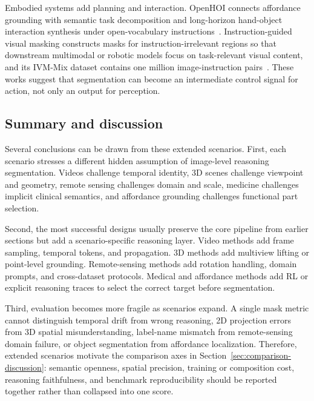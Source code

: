 Embodied systems add planning and interaction. OpenHOI connects affordance grounding with semantic task decomposition and long-horizon hand-object interaction synthesis under open-vocabulary instructions~\citep{zhangOpenhoiOpenworldHandobject2026}. Instruction-guided visual masking constructs masks for instruction-irrelevant regions so that downstream multimodal or robotic models focus on task-relevant visual content, and its IVM-Mix dataset contains one million image-instruction pairs~\citep{zhengInstructionguidedVisualMasking2024}. These works suggest that segmentation can become an intermediate control signal for action, not only an output for perception.

\subsection{Summary and discussion}

Several conclusions can be drawn from these extended scenarios. First, each scenario stresses a different hidden assumption of image-level reasoning segmentation. Videos challenge temporal identity, 3D scenes challenge viewpoint and geometry, remote sensing challenges domain and scale, medicine challenges implicit clinical semantics, and affordance grounding challenges functional part selection.

Second, the most successful designs usually preserve the core pipeline from earlier sections but add a scenario-specific reasoning layer. Video methods add frame sampling, temporal tokens, and propagation. 3D methods add multiview lifting or point-level grounding. Remote-sensing methods add rotation handling, domain prompts, and cross-dataset protocols. Medical and affordance methods add RL or explicit reasoning traces to select the correct target before segmentation.

Third, evaluation becomes more fragile as scenarios expand. A single mask metric cannot distinguish temporal drift from wrong reasoning, 2D projection errors from 3D spatial misunderstanding, label-name mismatch from remote-sensing domain failure, or object segmentation from affordance localization. Therefore, extended scenarios motivate the comparison axes in Section~\ref{sec:comparison-discussion}: semantic openness, spatial precision, training or composition cost, reasoning faithfulness, and benchmark reproducibility should be reported together rather than collapsed into one score.
